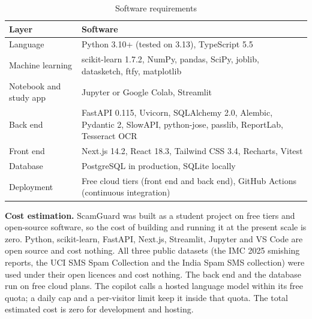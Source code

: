 \begin{table}[H]
\centering
\caption{Software requirements}
\label{tab:sw}
\begin{tabular}{|L{4.0cm}|L{10.3cm}|}
\hline
\textbf{Layer} & \textbf{Software} \\
\hline
Language & Python 3.10+ (tested on 3.13), TypeScript 5.5 \\
\hline
Machine learning & scikit-learn 1.7.2, NumPy, pandas, SciPy, joblib, datasketch, ftfy, matplotlib \\
\hline
Notebook and study app & Jupyter or Google Colab, Streamlit \\
\hline
Back end & FastAPI 0.115, Uvicorn, SQLAlchemy 2.0, Alembic, Pydantic 2, SlowAPI, python-jose, passlib, ReportLab, Tesseract OCR \\
\hline
Front end & Next.js 14.2, React 18.3, Tailwind CSS 3.4, Recharts, Vitest \\
\hline
Database & PostgreSQL in production, SQLite locally \\
\hline
Deployment & Free cloud tiers (front end and back end), GitHub Actions (continuous integration) \\
\hline
\end{tabular}
\end{table}

\textbf{Cost estimation.} ScamGuard was built as a student project on free tiers and open-source software, so the cost of building and running it at the present scale is zero. Python, scikit-learn, FastAPI, Next.js, Streamlit, Jupyter and VS Code are open source and cost nothing. All three public datasets (the IMC 2025 smishing reports, the UCI SMS Spam Collection and the India Spam SMS collection) were used under their open licences and cost nothing. The back end and the database run on free cloud plans. The copilot calls a hosted language model within its free quota; a daily cap and a per-visitor limit keep it inside that quota. The total estimated cost is zero for development and hosting.

